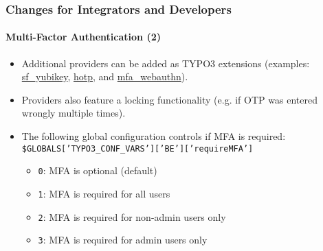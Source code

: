 %

\begin{frame}[fragile]
	\frametitle{Changes for Integrators and Developers}
	\framesubtitle{Multi-Factor Authentication (2)}

	\begin{itemize}

		\item Additional providers can be added as TYPO3 extensions\newline
			\smaller
				(examples:
				\href{https://github.com/derhansen/sf_yubikey}{sf\_yubikey},
				\href{https://github.com/o-ba/hotp}{hotp}, and
				\href{https://github.com/bnf/mfa_webauthn}{mfa\_webauthn}).
			\normalsize

		\item Providers also feature a locking functionality
			(e.g. if OTP was entered wrongly multiple times).

		\item The following global configuration controls if MFA is required:\newline
			\smaller\texttt{\$GLOBALS['TYPO3\_CONF\_VARS']['BE']['requireMFA']}\normalsize

			\begin{itemize}
				\item \texttt{0}: MFA is optional (default)
				\item \texttt{1}: MFA is required for all users
				\item \texttt{2}: MFA is required for non-admin users only
				\item \texttt{3}: MFA is required for admin users only
			\end{itemize}

	\end{itemize}

\end{frame}

